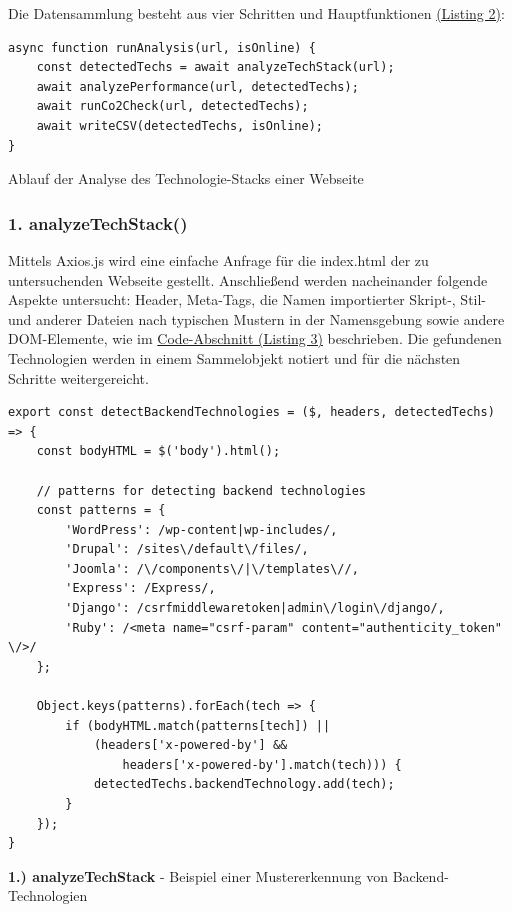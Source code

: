 \documentclass[Bachelor,BIF,german,IEEE]{BASE/twbook}
\begin{document}
\noindent Die Datensammlung besteht aus vier Schritten und Hauptfunktionen \hyperref[code:steps]{(Listing 2)}:
\begin{listing}[htbp]
\begin{verbatim}
async function runAnalysis(url, isOnline) {
    const detectedTechs = await analyzeTechStack(url);
    await analyzePerformance(url, detectedTechs);
    await runCo2Check(url, detectedTechs);
    await writeCSV(detectedTechs, isOnline);
}
\end{verbatim}
\caption{Ablauf der Analyse des Technologie-Stacks einer Webseite}
\label{code:steps}
\end{listing}

\subsubsection{1. analyzeTechStack()}
Mittels Axios.js wird eine einfache Anfrage für die index.html der zu untersuchenden Webseite gestellt. Anschließend werden nacheinander folgende Aspekte untersucht: Header, Meta-Tags, die Namen importierter Skript-, Stil- und anderer Dateien nach typischen Mustern in der Namensgebung sowie andere DOM-Elemente, wie im \hyperref[code:backend]{Code-Abschnitt (Listing 3)} beschrieben. Die gefundenen Technologien werden in einem Sammelobjekt notiert und für die nächsten Schritte weitergereicht.

\begin{listing}[htbp]
\begin{verbatim}
export const detectBackendTechnologies = ($, headers, detectedTechs) => {
    const bodyHTML = $('body').html();

    // patterns for detecting backend technologies
    const patterns = {
        'WordPress': /wp-content|wp-includes/,
        'Drupal': /sites\/default\/files/,
        'Joomla': /\/components\/|\/templates\//,
        'Express': /Express/,
        'Django': /csrfmiddlewaretoken|admin\/login\/django/,
        'Ruby': /<meta name="csrf-param" content="authenticity_token" \/>/
    };

    Object.keys(patterns).forEach(tech => {
        if (bodyHTML.match(patterns[tech]) || 
            (headers['x-powered-by'] && 
                headers['x-powered-by'].match(tech))) {
            detectedTechs.backendTechnology.add(tech);
        }
    });
}
\end{verbatim}
\caption{\textbf{1.) analyzeTechStack} - Beispiel einer Mustererkennung von Backend-Technologien}
\label{code:backend}
\end{listing}
\end{document}
